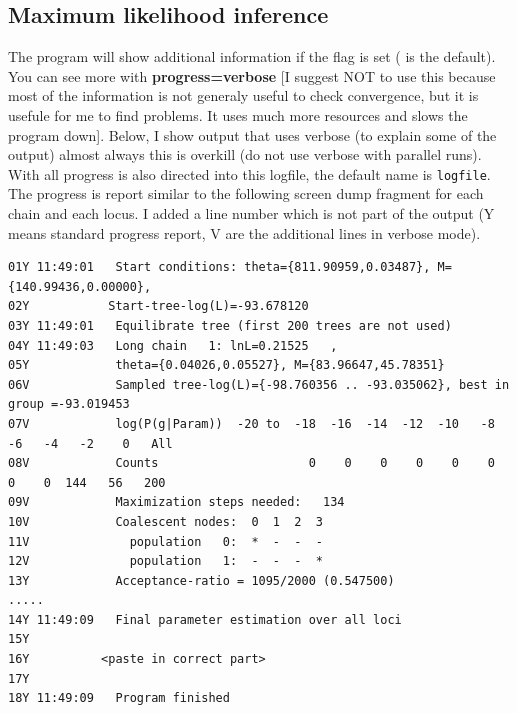 \subsection{Maximum likelihood inference}
The program will show additional information if the {} flag is set ({} is the default). You can see more with {\bf {progress=verbose}} [I suggest NOT to use this because most of the information is not generaly useful to check convergence, but it is usefule for me to find problems. It uses much more resources and slows the program down].
Below, I show output that uses verbose (to explain some of the output) almost always this is overkill (do not use verbose with parallel runs). 
With {} all progress is also directed into this logfile, the default name is 
{\tt logfile}. 
The progress is report similar to the following screen dump fragment
for each chain and each locus. I added a line number which is not part of 
the output (Y means standard progress report, V are the additional lines in verbose mode).
\begin{footnotesize}
\begin{tt}
\begin{verbatim}
01Y 11:49:01   Start conditions: theta={811.90959,0.03487}, M={140.99436,0.00000},
02Y           Start-tree-log(L)=-93.678120
03Y 11:49:01   Equilibrate tree (first 200 trees are not used)
04Y 11:49:03   Long chain   1: lnL=0.21525   ,
05Y            theta={0.04026,0.05527}, M={83.96647,45.78351}
06V            Sampled tree-log(L)={-98.760356 .. -93.035062}, best in group =-93.019453
07V            log(P(g|Param))  -20 to  -18  -16  -14  -12  -10   -8   -6   -4   -2    0   All
08V            Counts                     0    0    0    0    0    0    0    0  144   56   200
09V            Maximization steps needed:   134
10V            Coalescent nodes:  0  1  2  3 
11V              population   0:  *  -  -  - 
12V              population   1:  -  -  -  * 
13Y            Acceptance-ratio = 1095/2000 (0.547500)
.....
14Y 11:49:09   Final parameter estimation over all loci
15Y         
16Y          <paste in correct part>
17Y          
18Y 11:49:09   Program finished
\end{verbatim}
\end{tt}
\end{footnotesize}

